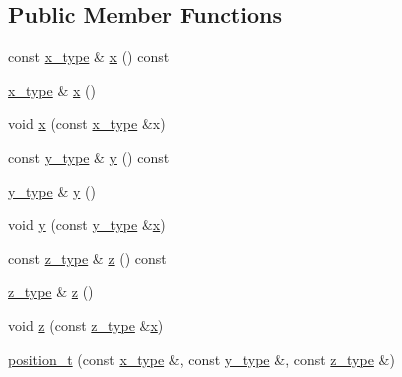 \subsection*{Public Member Functions}
\begin{DoxyCompactItemize}
\item 
const \hyperlink{classposition__t_a591a4bfd8546a40bc8dfca674cb54719}{x\-\_\-type} \& \hyperlink{classposition__t_a3234862041a420b148df2993ed9c75b1}{x} () const 
\item 
\hyperlink{classposition__t_a591a4bfd8546a40bc8dfca674cb54719}{x\-\_\-type} \& \hyperlink{classposition__t_a258659c62b3b658406bdac021ed2a97b}{x} ()
\item 
void \hyperlink{classposition__t_a931a6a071e6849d4a1c51ae3772da0c2}{x} (const \hyperlink{classposition__t_a591a4bfd8546a40bc8dfca674cb54719}{x\-\_\-type} \&x)
\item 
const \hyperlink{classposition__t_afe9eaece61abab81f8ead82576de6175}{y\-\_\-type} \& \hyperlink{classposition__t_a44d87bd86b273e13a2dce9099a18c2f0}{y} () const 
\item 
\hyperlink{classposition__t_afe9eaece61abab81f8ead82576de6175}{y\-\_\-type} \& \hyperlink{classposition__t_ac5a4d062bbc955ef8841a4fafffede1e}{y} ()
\item 
void \hyperlink{classposition__t_a7fbc8e321a2dfa788733da0a394e76ef}{y} (const \hyperlink{classposition__t_afe9eaece61abab81f8ead82576de6175}{y\-\_\-type} \&\hyperlink{classposition__t_a3234862041a420b148df2993ed9c75b1}{x})
\item 
const \hyperlink{classposition__t_ab6171c246c19584481804a5e2da8561f}{z\-\_\-type} \& \hyperlink{classposition__t_a9bd87ff076c8148d2006032ca384f101}{z} () const 
\item 
\hyperlink{classposition__t_ab6171c246c19584481804a5e2da8561f}{z\-\_\-type} \& \hyperlink{classposition__t_acf62d9861058a8cdcb6d92b0186ceb81}{z} ()
\item 
void \hyperlink{classposition__t_a6aaf348ba089e6c78be08d551e7ff5a5}{z} (const \hyperlink{classposition__t_ab6171c246c19584481804a5e2da8561f}{z\-\_\-type} \&\hyperlink{classposition__t_a3234862041a420b148df2993ed9c75b1}{x})
\item 
\hyperlink{classposition__t_a2eba479a9a39113d71a355f87ee23a5f}{position\-\_\-t} (const \hyperlink{classposition__t_a591a4bfd8546a40bc8dfca674cb54719}{x\-\_\-type} \&, const \hyperlink{classposition__t_afe9eaece61abab81f8ead82576de6175}{y\-\_\-type} \&, const \hyperlink{classposition__t_ab6171c246c19584481804a5e2da8561f}{z\-\_\-type} \&)

\end{DoxyCompactItemize}
